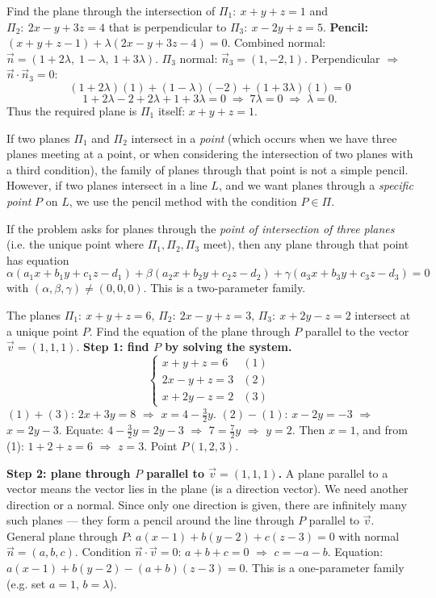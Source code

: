 \documentclass[11pt]{article}
\begin{document}
\begin{exoresolu}
Find the plane through the intersection of $\Pi_1:\ x+y+z=1$ and $\Pi_2:\ 2x-y+3z=4$ that is perpendicular to $\Pi_3:\ x-2y+z=5$.
\tcblower
\textbf{Pencil:} $(x+y+z-1)+\lambda(2x-y+3z-4)=0$.
Combined normal: $\vec{n}=(1+2\lambda,\;1-\lambda,\;1+3\lambda)$.
$\Pi_3$ normal: $\vec{n}_3=(1,-2,1)$.
Perpendicular $\Rightarrow$ $\vec{n}\cdot\vec{n}_3=0$:
\[
(1+2\lambda)(1)+(1-\lambda)(-2)+(1+3\lambda)(1)=0
\]
\[
1+2\lambda-2+2\lambda+1+3\lambda=0 \;\Longrightarrow\; 7\lambda=0 \;\Longrightarrow\; \lambda=0.
\]
Thus the required plane is $\Pi_1$ itself: $\boxed{x+y+z=1}$.
\end{exoresolu}

\begin{propriete}
If two planes $\Pi_1$ and $\Pi_2$ intersect in a \emph{point} (which occurs when we have three planes meeting at a point, or when considering the intersection of two planes with a third condition), the family of planes through that point is not a simple pencil. However, if two planes intersect in a line $L$, and we want planes through a \emph{specific point} $P$ on $L$, we use the pencil method with the condition $P\in\Pi$.

If the problem asks for planes through the \emph{point of intersection of three planes} (i.e. the unique point where $\Pi_1,\Pi_2,\Pi_3$ meet), then any plane through that point has equation
\[
\alpha(a_1x+b_1y+c_1z-d_1)+\beta(a_2x+b_2y+c_2z-d_2)+\gamma(a_3x+b_3y+c_3z-d_3)=0
\]
with $(\alpha,\beta,\gamma)\neq(0,0,0)$. This is a two-parameter family.
\end{propriete}

\begin{exoresolu}
The planes $\Pi_1:\ x+y+z=6$, $\Pi_2:\ 2x-y+z=3$, $\Pi_3:\ x+2y-z=2$ intersect at a unique point $P$. Find the equation of the plane through $P$ parallel to the vector $\vec{v}=(1,1,1)$.
\tcblower
\textbf{Step 1: find $P$ by solving the system.}
\[
\begin{cases}
x+y+z=6 & (1)\\
2x-y+z=3 & (2)\\
x+2y-z=2 & (3)
\end{cases}
\]
$(1)+(3)$: $2x+3y=8$ $\Rightarrow$ $x=4-\tfrac32y$.
$(2)-(1)$: $x-2y=-3$ $\Rightarrow$ $x=2y-3$.
Equate: $4-\tfrac32y=2y-3$ $\Rightarrow$ $7=\tfrac72y$ $\Rightarrow$ $y=2$.
Then $x=1$, and from (1): $1+2+z=6$ $\Rightarrow$ $z=3$.
Point $P(1,2,3)$.

\textbf{Step 2: plane through $P$ parallel to $\vec{v}=(1,1,1)$.}
A plane parallel to a vector means the vector lies in the plane (is a direction vector). We need another direction or a normal.
Since only one direction is given, there are infinitely many such planes — they form a pencil around the line through $P$ parallel to $\vec{v}$.
General plane through $P$: $a(x-1)+b(y-2)+c(z-3)=0$ with normal $\vec{n}=(a,b,c)$.
Condition $\vec{n}\cdot\vec{v}=0$: $a+b+c=0$ $\Rightarrow$ $c=-a-b$.
Equation: $a(x-1)+b(y-2)-(a+b)(z-3)=0$.
This is a one-parameter family (e.g. set $a=1$, $b=\lambda$).
\end{exoresolu}
\end{document}
